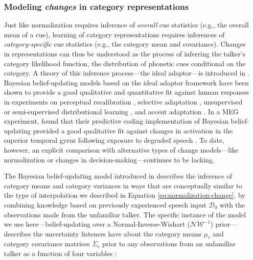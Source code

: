 \documentclass[
  11pt,
  man,floatsintext]{apa6}
\begin{document}
\subsubsection{\texorpdfstring{Modeling \emph{changes} in category representations}{Modeling changes in category representations}}\label{sec:ideal-adaptor}

Just like normalization requires inference of \emph{overall} cue statistics (e.g., the overall mean of a cue), learning of category representations requires inferences of \emph{category-specific} cue statistics (e.g., the category mean and covariance). Changes in representations can thus be understood as the process of inferring the talker's category likelihood function, the distribution of phonetic cues conditional on the category. A theory of this inference process---the ideal adaptor---is introduced in \textcite{kleinschmidt-jaeger2015}. Bayesian belief-updating models based on the ideal adaptor framework have been shown to provide a good qualitative and quantitative fit against human responses in experiments on perceptual recalibration \autocites{kleinschmidt-jaeger2011,kleinschmidt-jaeger2012}[for closely related models, see][]{xie2021cognition}, selective adaptation \autocite{kleinschmidt-jaeger2016pbr}, unsupervised or semi-supervised distributional learning \autocites[e.g.,][]{kim2020,kleinschmidt-jaeger2016cogsci,theodore-monto2019}[for closely related model, see][]{bejjanki2011,clayards2008}, and accent adaptation \autocites{hitczenko-feldman2016}[for a closely related model, see][]{tan2021}. In a MEG experiment, \textcite{sohoglu-davis2016} found that their predictive coding implementation of Bayesian belief-updating provided a good qualitative fit against changes in activation in the superior temporal gyrus following exposure to degraded speech \autocite[see also][]{davis-sohoglu2020}. To date, however, an explicit comparison with alternative types of change models---like normalization or changes in decision-making---continues to be lacking.

The Bayesian belief-updating model introduced in \textcite{kleinschmidt-jaeger2015} describes the inference of category means and category variances in ways that are conceptually similar to the type of interpolation we described in Equation \eqref{eq:normalization-change}, by combining knowledge based on previously experienced speech input \(\mathcal{D}_0\) with the observations made from the unfamiliar talker. The specific instance of the model we use here---belief-updating over a Normal-Inverse-Wishart (\(\mathcal{NW^{-1}}\)) prior---describes the uncertainty listeners have about the category means \(\mu_c\) and category covariance matrices \(\Sigma_c\) prior to any observations from an unfamiliar talker as a function of four variables \autocite[132-3]{murphy2012}:
\end{document}
